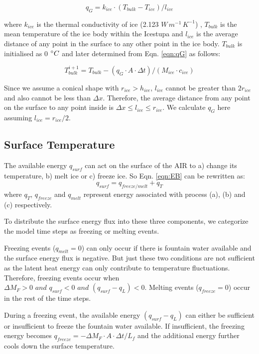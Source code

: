 \documentclass[utf8]{frontiersSCNS} %
\begin{document}
\begin{equation} q_{G} = k_{ice} \cdot (T_{bulk}-T_{ice})/l_{ice} \label{eqn:qG}    \end{equation}

where $k_{ice}$ is the thermal conductivity of ice (2.123 $W\, m^{-1}\,K^{-1}$) , $T_{bulk}$ is the mean temperature of
the ice body within the Icestupa and $l_{ice}$ is the average distance of any point in the surface to any other point
in the ice body. $T_{bulk}$ is initialised as 0 $\degree C$ and later determined from Eqn. \ref{eqn:qG} as follows:

\begin{equation} T_{bulk}^{i+1} = T_{bulk} - (q_{G} \cdot A \cdot \Delta t)/(M_{ice} \cdot c_{ice}) \end{equation}

Since we assume a conical shape with $r_{ice} > h_{ice}$, $l_{ice}$ cannot be greater than $2r_{ice}$ and also cannot
be less than $\Delta x$. Therefore, the average distance from any point on the surface to any point inside is $\Delta
x \leq l_{ice} \leq r_{ice}$. We calculate $q_{G}$ here assuming $l_{ice} = r_{ice}/2$.

\subsection{Surface Temperature} 
The available energy $q_{surf}$ can act on the surface of the AIR to a) change its temperature, b) melt ice or
c) freeze ice. So Eqn. \ref{eqn:EB} can be rewritten as: \begin{equation} q_{surf} = q_{freeze/melt} +
q_{T} \end{equation}
where $q_{T}$, $q_{freeze}$ and $q_{melt}$ represent energy associated with process (a), (b) and (c) respectively.

To distribute the surface energy flux into these three components, we categorize the model time steps as freezing or
melting events.

Freezing events ($q_{melt}=0$) can only occur if there is fountain water available and the surface energy flux is
negative. But just these two conditions are not sufficient as the latent heat energy can only contribute to temperature
fluctuations.  Therefore, freezing events occur when $ \Delta M_{F} > 0 \textit{ and } q_{surf} < 0 \textit{ and }
(q_{surf}-q_{L}) < 0$. Melting events ($q_{freeze}=0$) occur in the rest of the time steps.

During a freezing event, the available energy $(q_{surf}-q_{L})$ can either be sufficient or insufficient to freeze the
fountain water available. If insufficient, the freezing energy becomes $q_{freeze} = -\Delta M_{F} \cdot A \cdot \Delta
t/L_f$ and the additional energy further cools down the surface temperature.
\end{document}
